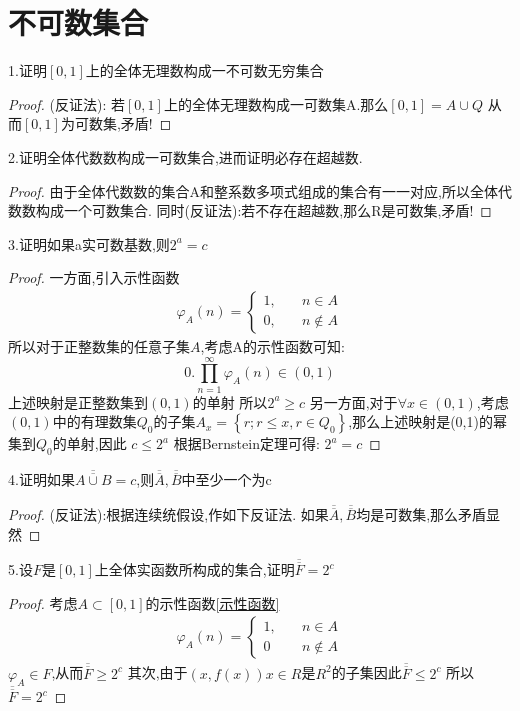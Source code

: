 \section{不可数集合}
1.证明\([0,1]\)上的全体无理数构成一不可数无穷集合
\begin{proof}
   (反证法):  若\([0,1]\)上的全体无理数构成一可数集A.那么\([0,1] = A\cup Q \) 从而\([0,1]\)为可数集,矛盾!
\end{proof}
2.证明全体代数数构成一可数集合,进而证明必存在超越数.
\begin{proof}
    由于全体代数数的集合A和整系数多项式组成的集合有一一对应,所以全体代数数构成一个可数集合.
    同时(反证法):若不存在超越数,那么R是可数集,矛盾!
\end{proof}
3.证明如果a实可数基数,则\(2^a =c\)
\begin{proof}
    一方面,引入示性函数
    \begin{align}\label{示性函数}
        \varphi_{A}(n)=\begin{cases}
            1, \quad&n\in A\\ 
            0,\quad &n \notin A
        \end{cases}
    \end{align}
    所以对于正整数集的任意子集\(A\),考虑A的示性函数可知:
    \[0.\prod_{n=1}^{\infty}\varphi_A (n) \in (0,1)\] 
    上述映射是正整数集到\((0,1)\)的单射
    所以\(2^a \geq c\)
    另一方面,对于\(\forall x \in (0,1)\),考虑\((0,1)\)中的有理数集\(Q_0\)的子集\(A_x=\left\{r;r\leq x , r\in Q_0 \right\}\),那么上述映射是(0,1)的幂集到\(Q_0\)的单射,因此 \(c \leq 2^a\)
    根据Bernstein定理可得: \(2^a = c\)
\end{proof}
4.证明如果\(\overline{\overline{A \cup B}} =c\),则\(\overline{\overline{A}},\overline{\overline{B}}\)中至少一个为c
\begin{proof}
    (反证法):根据连续统假设,作如下反证法. 如果\(\overline{\overline{A}},\overline{\overline{B}}\)均是可数集,那么矛盾显然
\end{proof}
5.设\(F\)是\([0,1]\)上全体实函数所构成的集合,证明\(\overline{\overline{F}}= 2^c\)
\begin{proof}
    考虑\(A \subset [0,1]\)的示性函数\ref{示性函数}\begin{align*}
        \varphi_A(n)=\begin{cases}
            1,\quad &n\in A \\ 
            0 \quad & n \notin A 
        \end{cases}
    \end{align*}
    \(\varphi_A \in F\),从而\(\overline{\overline{F}} \geq 2^c\)
    其次,由于\((x,f(x)) x \in R\)是\(R^2\)的子集因此\(\overline{\overline{F}} \leq 2^c\)
    所以\(\overline{\overline{F}} = 2^c\)
\end{proof}
